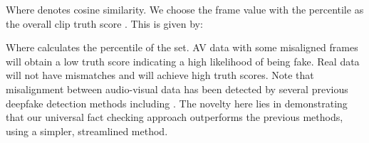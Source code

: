 \documentclass{article} \usepackage{iclr2024_conference,times}
\begin{document}
Where  denotes cosine similarity. We choose the frame value with the  percentile as the overall clip truth score . This is given by:

Where  calculates the  percentile of the set. AV data with some misaligned frames will obtain a low truth score indicating a high likelihood of being fake. Real data will not have mismatches and will achieve high truth scores. Note that misalignment between audio-visual data has been detected by several previous deepfake detection methods including \citet{owens}. The novelty here lies in demonstrating that our universal fact checking approach outperforms the previous methods, using a simpler, streamlined method.

\begin{table}[t]
\caption{AP and AUC (\%) FakeAVCeleb results, following the AVAD \citep{owens} evaluation protocol. Supervised methods are evaluated on unseen fake types. Best results are in bold.}
\label{tab:av}
\centering
{}
\end{table}
\end{document}
